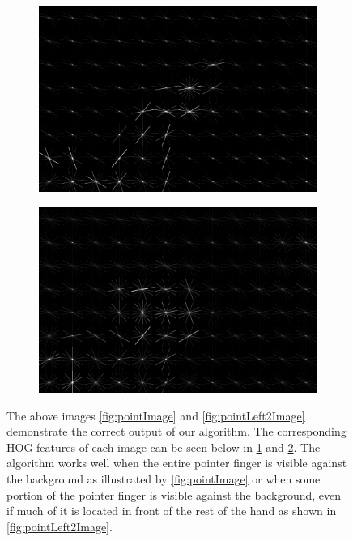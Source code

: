 \documentclass[10pt,twocolumn,letterpaper]{article}
\begin{document}
\begin{figure}[t]
\begin{center}
\begin{subfigure}[b]{0.45\linewidth}
			\includegraphics[width=\linewidth]{figures/PointHOGedit.png}
			\caption{}
			\label{fig:pointHogEdit}
		\end{subfigure}
		\begin{subfigure}[b]{0.45\linewidth}
			\includegraphics[width=\linewidth]{figures/PointLeft2HOGedit.png}
			\caption{}
			\label{fig:pointLeft2HogEdit}
		\end{subfigure}
	\end{center}
	\caption{The above images \ref{fig:pointImage} and \ref{fig:pointLeft2Image} demonstrate the correct output of our algorithm. The corresponding HOG features of each image can be seen below in \ref{fig:pointHogEdit} and \ref{fig:pointLeft2HogEdit}. The algorithm works well when the entire pointer finger is visible against the background as illustrated by \ref{fig:pointImage} or when some portion of the pointer finger is visible against the background, even if much of it is located in front of the rest of the hand as shown in \ref{fig:pointLeft2Image}.}
	\label{fig:pointImages}
\end{figure}
\end{document}
